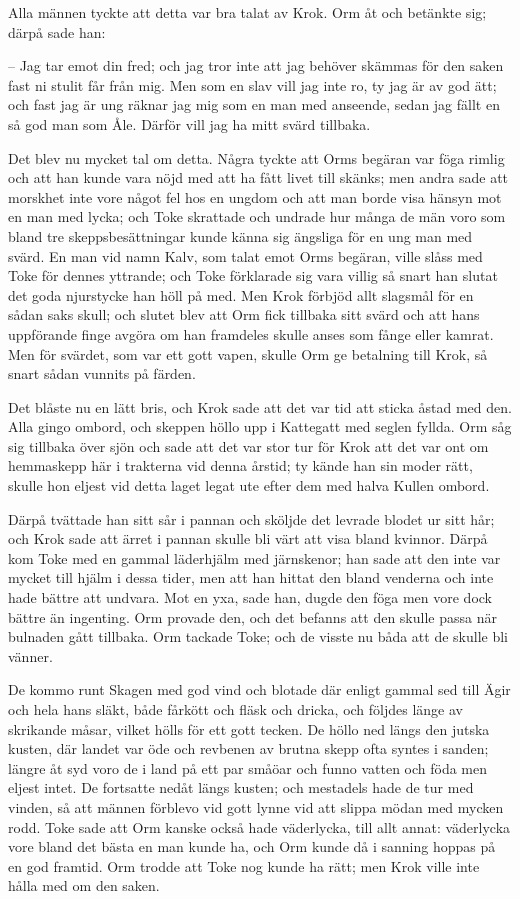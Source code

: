 \initial Alla männen tyckte att detta var bra talat av Krok. Orm åt och betänkte sig; därpå sade han:

– Jag tar emot din fred; och jag tror inte att jag behöver skämmas för den saken fast ni stulit får från mig. Men som en slav vill jag inte ro, ty jag är av god ätt; och fast jag är ung räknar jag mig som en man med anseende, sedan jag fällt en så god man som Åle. Därför vill jag ha mitt svärd tillbaka.

\initial Det blev nu mycket tal om detta. Några tyckte att Orms begäran var föga rimlig och att han kunde vara nöjd med att ha fått livet till skänks; men andra sade att morskhet inte vore något fel hos en ungdom och att man borde visa hänsyn mot en man med lycka; och Toke skrattade och undrade hur många de män voro som bland tre skeppsbesättningar kunde känna sig ängsliga för en ung man med svärd. En man vid namn Kalv, som talat emot Orms begäran, ville slåss med Toke för dennes yttrande; och Toke förklarade sig vara villig så snart han slutat det goda njurstycke han höll på med. Men Krok förbjöd allt slagsmål för en sådan saks skull; och slutet blev att Orm fick tillbaka sitt svärd och att hans uppförande finge avgöra om han framdeles skulle anses som fånge eller kamrat. Men för svärdet, som var ett gott vapen, skulle Orm ge betalning till Krok, så snart sådan vunnits på färden.

\initial Det blåste nu en lätt bris, och Krok sade att det var tid att sticka åstad med den. Alla gingo ombord, och skeppen höllo upp i Kattegatt med seglen fyllda. Orm såg sig tillbaka över sjön och sade att det var stor tur för Krok att det var ont om hemmaskepp här i trakterna vid denna årstid; ty kände han sin moder rätt, skulle hon eljest vid detta laget legat ute efter dem med halva Kullen ombord.

\initial Därpå tvättade han sitt sår i pannan och sköljde det levrade blodet ur sitt hår; och Krok sade att ärret i pannan skulle bli värt att visa bland kvinnor. Därpå kom Toke med en gammal läderhjälm med järnskenor; han sade att den inte var mycket till hjälm i dessa tider, men att han hittat den bland venderna och inte hade bättre att undvara. Mot en yxa, sade han, dugde den föga men vore dock bättre än ingenting. Orm provade den, och det befanns att den skulle passa när bulnaden gått tillbaka. Orm tackade Toke; och de visste nu båda att de skulle bli vänner.

\initial De kommo runt Skagen med god vind och blotade där enligt gammal sed till Ägir och hela hans släkt, både fårkött och fläsk och dricka, och följdes länge av skrikande måsar, vilket hölls för ett gott tecken. De höllo ned längs den jutska kusten, där landet var öde och revbenen av brutna skepp ofta syntes i sanden; längre åt syd voro de i land på ett par småöar och funno vatten och föda men eljest intet. De fortsatte nedåt längs kusten; och mestadels hade de tur med vinden, så att männen förblevo vid gott lynne vid att slippa mödan med mycken rodd. Toke sade att Orm kanske också hade väderlycka, till allt annat: väderlycka vore bland det bästa en man kunde ha, och Orm kunde då i sanning hoppas på en god framtid. Orm trodde att Toke nog kunde ha rätt; men Krok ville inte hålla med om den saken.

